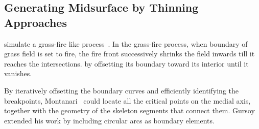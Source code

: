	

\subsection{Generating Midsurface by Thinning Approaches}

 simulate a grass-fire like process~\cite{Harry1967}. In the grass-fire process, when boundary of grass field is set to fire, the fire front successively shrinks the field inwards till it reaches the intersections.  by offsetting its boundary toward its interior until it vanishes. %

By iteratively offsetting the boundary curves and efficiently identifying the breakpoints, Montanari~\cite{Montanari1969} could locate all the critical points on the medial axis, together with the geometry of the skeleton segments that connect them. Gursoy~\cite{Gursoy1989} extended his work by including circular arcs as boundary elements.

